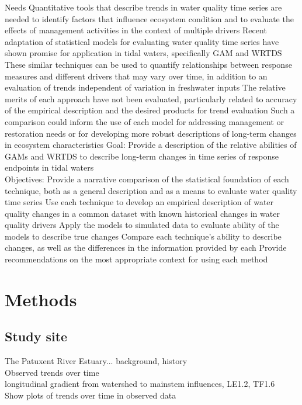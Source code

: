 \documentclass[letterpaper,12pt,oneside]{article}\usepackage[]{graphicx}\usepackage[]{color}
\begin{document}
\begin{outline}
\0 \noindent Needs
\1 Quantitative tools that describe trends in water quality time series are needed to identify factors that influence ecosystem condition and to evaluate the effects of management activities in the context of multiple drivers
\1 Recent adaptation of statistical models for evaluating water quality time series have shown promise for application in tidal waters, specifically \ac{GAM} and \ac{WRTDS}
\1 These similar techniques can be used to quantify relationships between response measures and different drivers that may vary over time, in addition to an evaluation of trends independent of variation in freshwater inputs
\1 The relative merits of each approach have not been evaluated, particularly related to accuracy of the empirical description and the desired products for trend evaluation
\1 Such a comparison could inform the use of each model for addressing management or restoration needs or for developing more robust descriptions of long-term changes in ecosystem characteristics
\0 Goal: Provide a description of the relative abilities of \acp{GAM} and \ac{WRTDS} to describe long-term changes in time series of response endpoints in tidal waters \\
\0 \noindent Objectives:
\1 Provide a narrative comparison of the statistical foundation of each technique, both as a general description and as a means to evaluate water quality time series
\1 Use each technique to develop an empirical description of water quality changes in a common dataset with known historical changes in water quality drivers
\1 Apply the models to simulated data to evaluate ability of the models to describe true changes
\1 Compare each technique's ability to describe changes, as well as the differences in the information provided by each
\1 Provide recommendations on the most appropriate context for using each method
\end{outline}

\section{Methods}

\subsection{Study site}

The Patuxent River Estuary... background, history \\
Observed trends over time \\
longitudinal gradient from watershed to mainstem influences, LE1.2, TF1.6\\
Show plots of trends over time in observed data \\
\end{document}
